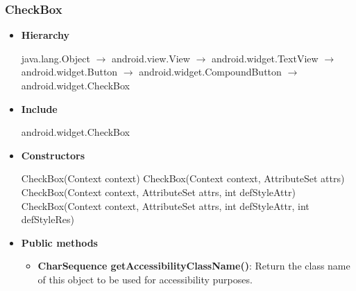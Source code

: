 \documentclass{report}
\begin{document}
    \subsubsection{CheckBox}
    \begin{itemize}
        \item \textbf{Hierarchy} 
            \begin{center}
                java.lang.Object $\to$	android.view.View $\to$	android.widget.TextView $\to$	android.widget.Button $\to$	android.widget.CompoundButton $\to$	android.widget.CheckBox
            \end{center}
        \item \textbf{Include}
            \bigbreak \noindent 
            \begin{javacode}
                android.widget.CheckBox
            \end{javacode}
        \item \textbf{Constructors}
            \bigbreak \noindent 
            \begin{javacode}
                CheckBox(Context context)
                CheckBox(Context context, AttributeSet attrs)
                CheckBox(Context context, AttributeSet attrs, int defStyleAttr)
                CheckBox(Context context, AttributeSet attrs, int defStyleAttr, int defStyleRes)
            \end{javacode}
        \item \textbf{Public methods}
            \begin{itemize}
                \item \textbf{CharSequence getAccessibilityClassName()}: Return the class name of this object to be used for accessibility purposes.
            \end{itemize}
    \end{itemize}

    \pagebreak 
\end{document}
